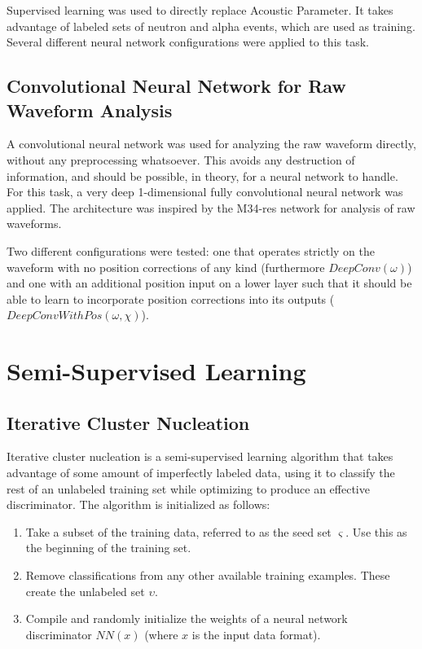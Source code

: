 \documentclass[10pt]{article}
\begin{document}
Supervised learning was used to directly replace Acoustic Parameter. It takes advantage of labeled sets of neutron and alpha events, which are used as training. Several different neural network configurations were applied to this task.

\subsection{Convolutional Neural Network for Raw Waveform Analysis}

A convolutional neural network was used for analyzing the raw waveform directly, without any preprocessing whatsoever. This avoids any destruction of information, and should be possible, in theory, for a neural network to handle. For this task, a very deep 1-dimensional fully convolutional neural network was applied. The architecture was inspired by the M34-res network \cite{verydeepconvnets} for analysis of raw waveforms.

Two different configurations were tested: one that operates strictly on the waveform with no position corrections of any kind (furthermore $DeepConv(\omega)$) and one with an additional position input on a lower layer such that it should be able to learn to incorporate position corrections into its outputs ($DeepConvWithPos(\omega, \chi)$).

\section{Semi-Supervised Learning}

\subsection{Iterative Cluster Nucleation}

Iterative cluster nucleation is a semi-supervised learning algorithm that takes advantage of some amount of imperfectly labeled data, using it to classify the rest of an unlabeled training set while optimizing to produce an effective discriminator. The algorithm is initialized as follows:

\begin{enumerate}
    \item Take a subset of the training data, referred to as the seed set $\varsigma$. Use this as the beginning of the training set.
    \item Remove classifications from any other available training examples. These create the unlabeled set $\upsilon$.
    \item Compile and randomly initialize the weights of a neural network discriminator $NN(x)$ (where $x$ is the input data format).
\end{enumerate}
\end{document}
